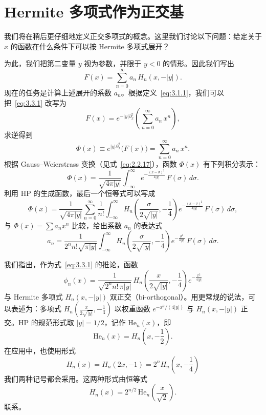 \section{Hermite 多项式作为正交基}
\label{sec:3.3}

我们将在稍后更仔细地定义正交多项式的概念。这里我们讨论以下问题：给定关于 $x$ 的函数在什么条件下可以按 Hermite 多项式展开？

为此，我们把第二变量 $y$ 视为参数，并限于 $y<0$ 的情形。因此我们写出
\begin{equation}
F(x)=\sum_{n=0}^{\infty}a_n\,H_n(x,-|y|).
\label{eq:3.3.1}
\end{equation}
现在的任务是计算上述展开的系数 $a_n$。根据定义~\eqref{eq:3.1.1}，我们可以把~\eqref{eq:3.3.1} 改写为
\[
F(x)=e^{-|y|\partial_x^2}\!\left(\sum_{n=0}^{\infty}a_n\,x^n\right),
\]
求逆得到
\[
\Phi(x)\equiv e^{|y|\partial_x^2}\!\bigl(F(x)\bigr)
=\sum_{n=0}^{\infty}a_n\,x^n.
\]
根据 Gauss--Weierstrass 变换（见式~\eqref{eq:2.2.17}），函数 $\Phi(x)$ 有下列积分表示：
\begin{equation}
\Phi(x)=\frac{1}{\sqrt{4\pi|y|}}\int_{-\infty}^{\infty}
e^{-\frac{(x-\sigma)^2}{4|y|}}\,F(\sigma)\,d\sigma.
\label{eq:3.3.4}
\end{equation}
利用 HP 的生成函数，最后一个恒等式可以写成
\[
\Phi(x)=\frac{1}{\sqrt{4\pi|y|}}
 \sum_{n=0}^{\infty}\frac{1}{n!}
 \int_{-\infty}^{\infty}
 H_n\!\left(\frac{\sigma}{2\sqrt{|y|}},-\frac{1}{4}\right)
 e^{-\frac{(x-\sigma)^2}{4|y|}}\,F(\sigma)\,d\sigma,
\]
与 $\Phi(x)=\sum a_n x^n$ 比较，给出系数 $a_n$ 的表达式
\begin{equation}
a_n=\frac{1}{2^n n!\sqrt{\pi|y|}}
\int_{-\infty}^{\infty}
H_n\!\left(\frac{\sigma}{2\sqrt{|y|}},-\frac{1}{4}\right)
e^{-\frac{\sigma^2}{4|y|}}\,F(\sigma)\,d\sigma.
\label{eq:3.3.6}
\end{equation}

我们指出，作为式~\eqref{eq:3.3.1} 的推论，函数
\begin{equation}
\phi_n(x)=\frac{1}{\sqrt{2^n n!\,\pi|y|}}\,
H_n\!\left(\frac{x}{2\sqrt{|y|}},-\frac{1}{4}\right)
e^{-\frac{x^2}{4|y|}}
\label{eq:3.3.7}
\end{equation}
与 Hermite 多项式 $H_n(x,-|y|)$ 双正交（bi-orthogonal）。用更常规的说法，可以表述为：多项式 $H_n\!\left(\frac{x}{2\sqrt{|y|}},-\frac{1}{4}\right)$ 以权重函数 $e^{-x^2/(4|y|)}$ 与 $H_n(x,-|y|)$ 正交。HP 的规范形式取 $|y|=1/2$，记作 $\mathrm{He}_n(x)$，即
\begin{equation}
\mathrm{He}_n(x)=H_n\!\left(x,-\frac{1}{2}\right).
\label{eq:3.3.8}
\end{equation}
在应用中，也使用形式
\begin{equation}
H_n(x)=H_n(2x,-1)=2^n H_n\!\left(x,-\frac{1}{4}\right)
\label{eq:3.3.9}
\end{equation}
我们两种记号都会采用。这两种形式由恒等式
\begin{equation}
H_n(x)=2^{n/2}\,\mathrm{He}_n\!\left(\frac{x}{\sqrt{2}}\right).
\label{eq:3.3.10}
\end{equation}
联系。

